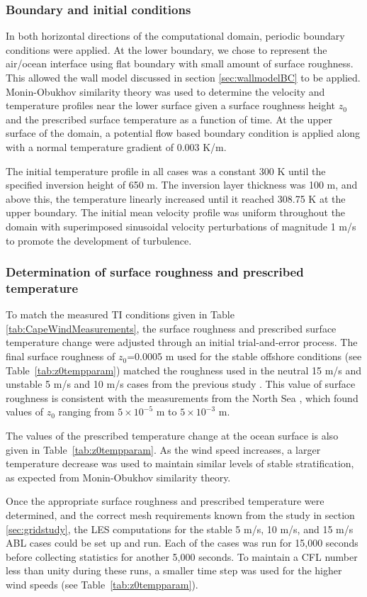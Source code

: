 \subsubsection{Boundary and initial conditions}
In both horizontal directions of the computational domain, periodic
boundary conditions were applied.  At the lower boundary, we chose to
represent the air/ocean interface using flat boundary with small
amount of surface roughness.  This allowed the wall model discussed in
section \ref{sec:wallmodelBC} to be applied.  Monin-Obukhov similarity
theory was used to determine the velocity and temperature profiles
near the lower surface given a surface roughness height $z_0$ and the
prescribed surface temperature as a function of time.  At the upper
surface of the domain, a potential flow based boundary condition is
applied along with a normal temperature gradient of 0.003 K/m.

The initial temperature profile in all cases was a constant 300 K until
the specified inversion height of 650 m.  The inversion layer thickness
was 100 m, and above this, the temperature linearly increased until it
reached 308.75 K at the upper boundary.  The initial mean velocity
profile was uniform throughout the domain with superimposed sinusoidal
velocity perturbations of magnitude 1 m/s to promote the development
of turbulence.

\subsubsection{Determination of surface roughness and prescribed temperature }
To match the measured TI conditions given in Table
\ref{tab:CapeWindMeasurements}, the surface roughness and prescribed
surface temperature change were adjusted through an initial
trial-and-error process.  The final surface roughness of $z_0$=0.0005 m
used for the stable offshore conditions (see Table~\ref{tab:z0tempparam})
matched the roughness used in the neutral 15 m/s and unstable 5 m/s and
10 m/s cases from the previous study \cite{cheung2020large}.  This
value of surface roughness is consistent with the measurements from
the North Sea \cite{taylor2001dependence}, which found values of $z_0$
ranging from $5 \times 10^{-5}$ m to $5\times 10^{-3}$ m.

The values of the prescribed temperature change at the ocean surface
is also given in Table~\ref{tab:z0tempparam}.  As the wind
speed increases, a larger temperature decrease was used to maintain
similar levels of stable stratification, as expected from
Monin-Obukhov similarity theory.

Once the appropriate surface roughness and prescribed temperature were
determined, and the correct mesh requirements known from the study in
section \ref{sec:gridstudy}, the LES computations for the stable 5 m/s,
10 m/s, and 15 m/s ABL cases could be set up and run.  Each of the cases
was run for 15,000 seconds before collecting statistics for another
5,000 seconds.  To maintain a CFL number less than unity during these
runs, a smaller time step was used for the higher wind speeds (see
Table~\ref{tab:z0tempparam}).
